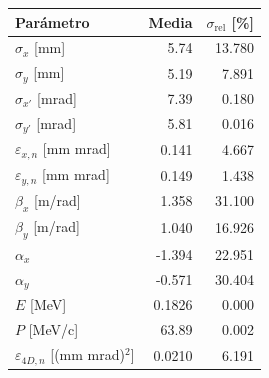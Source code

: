 \begin{tabular}{lrr}
\toprule
Parámetro & Media & $\sigma_{\mathrm{rel}}$ [\%] \\
\midrule
$\sigma_x$ [mm] & 5.74 & 13.780 \\
$\sigma_y$ [mm] & 5.19 & 7.891 \\
$\sigma_{x'}$ [mrad] & 7.39 & 0.180 \\
$\sigma_{y'}$ [mrad] & 5.81 & 0.016 \\
$\varepsilon_{x,n}$ [mm mrad] & 0.141 & 4.667 \\
$\varepsilon_{y,n}$ [mm mrad] & 0.149 & 1.438 \\
$\beta_x$ [m/rad] & 1.358 & 31.100 \\
$\beta_y$ [m/rad] & 1.040 & 16.926 \\
$\alpha_x$ & -1.394 & 22.951 \\
$\alpha_y$ & -0.571 & 30.404 \\
$E$ [MeV] & 0.1826 & 0.000 \\
$P$ [MeV/c] & 63.89 & 0.002 \\
$\varepsilon_{4D,n}$ [(mm mrad)$^2$] & 0.0210 & 6.191 \\
\bottomrule
\end{tabular}
